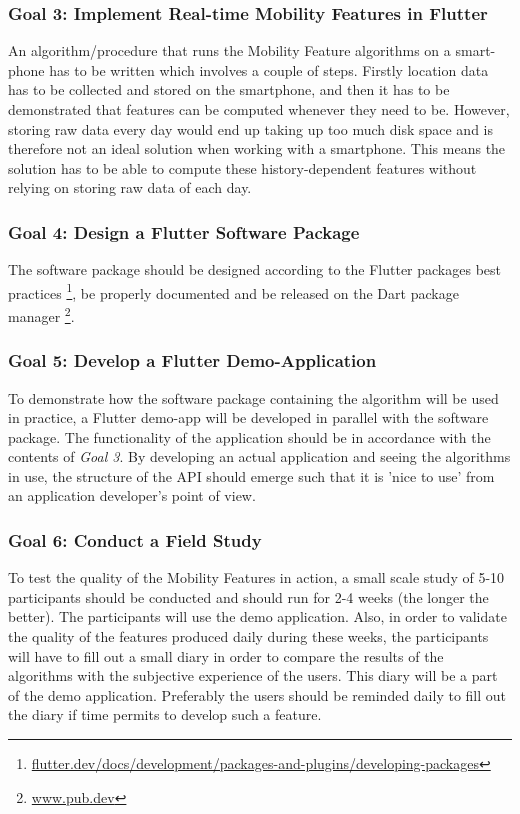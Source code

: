 \subsubsection*{Goal 3: Implement Real-time Mobility Features in Flutter}
An algorithm/procedure that runs the Mobility Feature algorithms on a smart-phone has to be written which involves a couple of steps. Firstly location data has to be collected and stored on the smartphone, and then it has to be demonstrated that features can be computed whenever they need to be. However, storing raw data every day would end up taking up too much disk space and is therefore not an ideal solution when working with a smartphone. This means the solution has to be able to compute these history-dependent features without relying on storing raw data of each day.

\subsubsection*{Goal 4: Design a Flutter Software Package}
The software package should be designed according to the Flutter packages best practices \footnote{\url{flutter.dev/docs/development/packages-and-plugins/developing-packages}}, be properly documented and be released on the Dart package manager \footnote{\url{www.pub.dev}}.

\subsubsection*{Goal 5: Develop a Flutter Demo-Application}
To demonstrate how the software package containing the algorithm will be used in practice, a Flutter demo-app will be developed in parallel with the software package. The functionality of the application should be in accordance with the contents of \textit{Goal 3}. By developing an actual application and seeing the algorithms in use, the structure of the API should emerge such that it is 'nice to use' from an application developer's point of view.

\subsubsection*{Goal 6: Conduct a Field Study}
To test the quality of the Mobility Features in action, a small scale study of 5-10 participants should be conducted and should run for 2-4 weeks (the longer the better). The participants will use the demo application. Also, in order to validate the quality of the features produced daily during these weeks, the participants will have to fill out a small diary in order to compare the results of the algorithms with the subjective experience of the users. This diary will be a part of the demo application. Preferably the users should be reminded daily to fill out the diary if time permits to develop such a feature.

